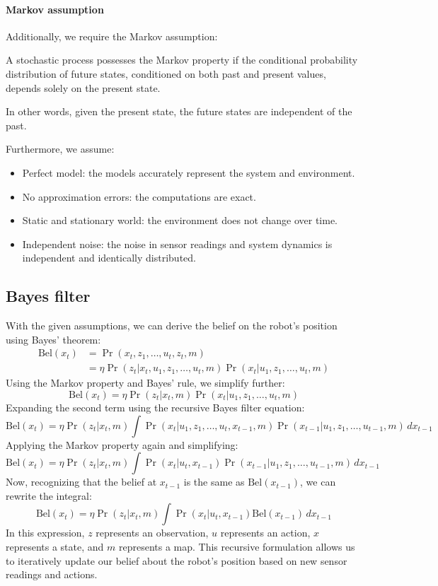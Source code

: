 \paragraph*{Markov assumption}
Additionally, we require the Markov assumption:
\begin{property}
    A stochastic process possesses the Markov property if the conditional probability distribution of future states, conditioned on both past and present values, depends solely on the present state.
\end{property}
In other words, given the present state, the future states are independent of the past.

Furthermore, we assume:
\begin{itemize}
    \item Perfect model: the models accurately represent the system and environment.
    \item No approximation errors: the computations are exact.
    \item Static and stationary world: the environment does not change over time.
    \item Independent noise: the noise in sensor readings and system dynamics is independent and identically distributed.
\end{itemize}


\subsection{Bayes filter}
With the given assumptions, we can derive the belief on the robot's position using Bayes' theorem:
\begin{align*}
    \text{Bel}(x_t) &=\Pr(x_t,z_1,\dots,u_t,z_t,m) \\
                    &=\eta\Pr(z_t|x_t,u_1,z_1,\dots,u_t,m)\Pr(x_t|u_1,z_1,\dots,u_t,m) 
\end{align*}
Using the Markov property and Bayes' rule, we simplify further:
\[\text{Bel}(x_t)=\eta\Pr(z_t|x_t,m)\Pr(x_t|u_1,z_1,\dots,u_t,m)\]
Expanding the second term using the recursive Bayes filter equation:
\[\text{Bel}(x_t)=\eta\Pr(z_t|x_t,m)\int\Pr(x_t|u_1,z_1,\dots,u_t,x_{t-1},m)\Pr(x_{t-1}|u_1,z_1,\dots,u_{t-1},m)\,dx_{t-1}\]
Applying the Markov property again and simplifying:
\[\text{Bel}(x_t)=\eta\Pr(z_t|x_t,m)\int\Pr(x_t|u_t,x_{t-1})\Pr(x_{t-1}|u_1,z_1,\dots,u_{t-1},m)\,dx_{t-1}\]
Now, recognizing that the belief at $x_{t-1}$ is the same as $\text{Bel}(x_{t-1})$, we can rewrite the integral:
\[\text{Bel}(x_t)=\eta\Pr(z_t|x_t,m)\int\Pr(x_t|u_t,x_{t-1})\text{Bel}(x_{t-1})\,dx_{t-1}\]
In this expression, $z$ represents an observation, $u$ represents an action, $x$ represents a state, and $m$ represents a map.
This recursive formulation allows us to iteratively update our belief about the robot's position based on new sensor readings and actions.

